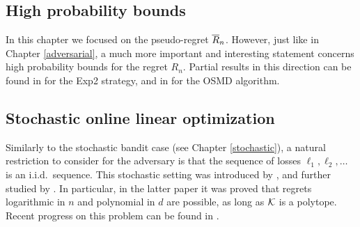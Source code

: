 \subsection{High probability bounds} \label{sec:hplinear}
In this chapter we focused on the pseudo-regret $\overline{R}_n$. However, just like in Chapter \ref{adversarial}, a much more important and interesting statement concerns high probability bounds for the regret $R_n$. Partial results in this direction can be found in \cite{BDHKRT08} for the Exp2 strategy, and in \cite{AR09} for the OSMD algorithm.

\subsection{Stochastic online linear optimization} \label{sec:stochlinear}
Similarly to the stochastic bandit case (see Chapter \ref{stochastic}), a natural restriction to consider for the adversary is that the sequence of losses $\ell_1,\ell_2,\ldots$ is an i.i.d.\ sequence. This stochastic setting was introduced by \cite{Aue02}, and further studied by \cite{DHK08b}. In particular, in the latter paper it was proved that regrets logarithmic in $n$ and polynomial in $d$ are possible, as long as $\mathcal{K}$ is a polytope. Recent progress on this problem can be found in \cite{RT10, filippi2010parametric, APS11}.
